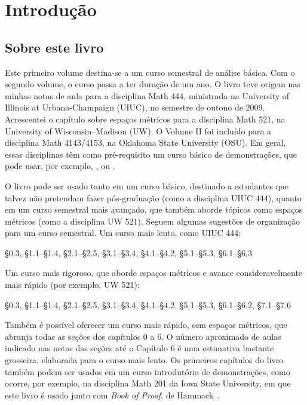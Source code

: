 \chapter*{Introdução}


\section{Sobre este livro}

\VolOneIntroExtrahead

Este primeiro volume destina-se a um curso semestral de análise básica.
Com o segundo volume, o curso passa a ter duração de um ano.
O livro teve origem nas minhas notas de aula para a disciplina Math 444,
ministrada na University of Illinois at Urbana-Champaign (UIUC), no semestre
de outono de 2009. Acrescentei o capítulo sobre espaços métricos para a
disciplina Math 521, na University of Wisconsin--Madison (UW)\@.
O Volume II foi incluído para a disciplina Math 4143/4153, na Oklahoma State
University (OSU)\@.
Em geral, essas disciplinas têm como pré-requisito um curso básico de
demonstrações, que pode usar, por exemplo, \cite{Hammack}, \cite{GIAM} ou
\cite{DW}.

O livro pode ser usado tanto em um curso básico, destinado a estudantes que
talvez não pretendam fazer pós-graduação (como a disciplina UIUC 444), quanto
em um curso semestral mais avançado, que também aborde tópicos como espaços
métricos (como a disciplina UW 521).
Seguem algumas sugestões de organização para um curso semestral.
Um curso mais lento, como UIUC 444:
\begin{center}
\S0.3, \S1.1--\S1.4, \S2.1--\S2.5, \S3.1--\S3.4, \S4.1--\S4.2,
\S5.1--\S5.3, \S6.1--\S6.3
\end{center}
Um curso mais rigoroso, que aborde espaços métricos e avance
consideravelmente mais rápido (por exemplo, UW 521):
\begin{center}
\S0.3, \S1.1--\S1.4, \S2.1--\S2.5, \S3.1--\S3.4, \S4.1--\S4.2,
\S5.1--\S5.3, \S6.1--\S6.2, \S7.1--\S7.6
\end{center}
Também é possível oferecer um curso mais rápido, sem espaços métricos, que
abranja todas as seções dos capítulos 0 a 6. O número aproximado de aulas
indicado nas notas das seções até o Capítulo 6 é uma estimativa bastante
grosseira, elaborada para o curso mais lento.
Os primeiros capítulos do livro também podem ser usados em um curso
introdutório de demonstrações, como ocorre, por exemplo, na disciplina Math
201 da Iowa State University, em que este livro é usado junto com
\emph{Book of Proof}, de Hammack~\cite{Hammack}.

